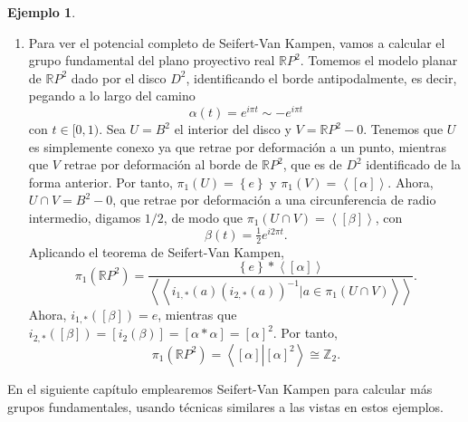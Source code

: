 \documentclass[12pt,a4paper]{book}
\theoremstyle{definition} \newtheorem{defn}[thm]{Definición}
\theoremstyle{definition} \newtheorem{ejemplo}[thm]{Ejemplo}
\theoremstyle{definition} \newtheorem{ejercicio}[thm]{Ejercicio}
\theoremstyle{remark} \newtheorem*{obs}{Observación}
\def\ZZ{\mathbb{Z}}
\def\RR{\mathbb{R}}
\def\gf{\pi_1}
\newcommand\gen[1]{\left\langle #1 \right\rangle}
\newcommand\ngen[1]{\left\langle\left\langle #1 \right\rangle \right\rangle}
\begin{document}
\begin{ejemplo}
\begin{enumerate}
     \item Para ver el potencial completo de Seifert-Van Kampen, vamos a calcular el grupo fundamental del plano proyectivo real $\RR P^2$. Tomemos el modelo planar de $\RR P^2$ dado por el disco $D^2$, identificando el borde antipodalmente, es decir, pegando a lo largo del camino 
       \begin{equation*}
	 \alpha(t)=e^{i\pi t}\sim -e^{i\pi t}
       \end{equation*}
       con $t\in [0,1)$. Sea $U=B^2$ el interior del disco y $V=\RR P^2-{0}$. Tenemos que $U$ es simplemente conexo ya que retrae por deformación a un punto, mientras que $V$ retrae por deformación al borde de $\RR P^2$, que es de $D^2$ identificado de la forma anterior. Por tanto, $\gf(U)=\left\{ e \right\}$ y $\gf(V)=\gen{ [\alpha]}$. Ahora, $U\cap V=B^2-{0}$, que retrae por deformación a una circunferencia de radio intermedio, digamos $1/2$, de modo que $\gf(U\cap V)=\gen{ [\beta] }$, con 
       \begin{equation*}
	 \beta(t)=\tfrac{1}{2}e^{i2\pi t}.
       \end{equation*}
       Aplicando el teorema de Seifert-Van Kampen, 
       \begin{equation*}
	 \gf(\RR P^2)=\frac{\left\{ e \right\}*\gen{ [\alpha] }}{\ngen{i_{1,*}(a)(i_{2,*}(a))^{-1}|a\in \gf(U\cap V)}}.
       \end{equation*}
       Ahora, $i_{1,*}([\beta])=e$, mientras que $i_{2,*}([\beta])=[i_2(\beta)]=[\alpha*\alpha]=[\alpha]^2$. Por tanto, 
       \begin{equation*}
	 \gf(\RR P^2)=\gen{[\alpha]\left|[\alpha]^2\right.}\cong \ZZ_2.
       \end{equation*}
   \end{enumerate}
 \end{ejemplo}

 En el siguiente capítulo emplearemos Seifert-Van Kampen para calcular más grupos fundamentales, usando técnicas similares a las vistas en estos ejemplos.
\end{document}
